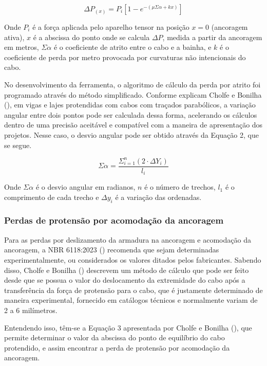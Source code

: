\begin{equation}
\Delta P_{(x)} = P_i [1 - e^{-(\mu \Sigma \alpha + kx)}]
\end{equation}\bigskip

Onde $P_i$ é a força aplicada pelo aparelho tensor na posição $x = 0$ (ancoragem ativa), $x$ é a abscissa do ponto onde se calcula $\Delta P$, medida a partir da ancoragem em metros, $\Sigma \alpha$ é o coeficiente de atrito entre o cabo e a bainha, e $k$ é o coeficiente de perda por metro provocada por curvaturas não intencionais do cabo.

No desenvolvimento da ferramenta, o algoritmo de cálculo da perda por atrito foi programado através do método simplificado. Conforme explicam Cholfe e Bonilha (\citeyear{CB}), em vigas e lajes protendidas com cabos com traçados parabólicos, a variação angular entre dois pontos pode ser calculada dessa forma, acelerando os cálculos dentro de uma precisão aceitável e compatível com a maneira de apresentação dos projetos. Nesse caso, o desvio angular pode ser obtido através da Equação 2, que se segue.\bigskip

\begin{equation}
\Sigma \alpha = \frac{\Sigma^n_{i=1} (2 \cdot \Delta Y_i)}{l_i} 
\end{equation}\bigskip

Onde $\Sigma \alpha$ é o desvio angular em radianos, $n$ é o número de trechos, $l_1$ é o comprimento de cada trecho e $\Delta y_i$ é a variação das ordenadas. 

\subsubsection{Perdas de protensão por acomodação da ancoragem}

\hspace{0.4cm}Para as perdas por deslizamento da armadura na ancoragem e acomodação da ancoragem, a NBR 6118:2023 (\citeyear{NOAB}) recomenda que sejam determinadas experimentalmente, ou considerados os valores ditados pelos fabricantes. Sabendo disso, Cholfe e Bonilha (\citeyear{CB}) descrevem um método de cálculo que pode ser feito desde que se possua o valor do deslocamento da extremidade do cabo após a transferência da força de protensão para o cabo, que é justamente determinado de maneira experimental, fornecido em catálogos técnicos e normalmente variam de 2 a 6 milímetros.

Entendendo isso, têm-se a Equação 3 apresentada por Cholfe e Bonilha (\citeyear{CB}), que permite determinar o valor da abscissa do ponto de equilíbrio do cabo protendido, e assim encontrar a perda de protensão por acomodação da ancoragem.\bigskip

